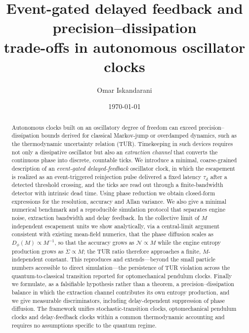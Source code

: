 \documentclass[aps,pre,reprint,amsmath,amssymb,floatfix,nofootinbib]{revtex4-2}
\newcommand{\Sdot}{\dot{\Sigma}}
\newcommand{\Dphi}{D_{\phi}}
\newcommand{\taud}{\tau_{\mathrm{d}}}
\begin{document}
\title{Event-gated delayed feedback and precision--dissipation\\
trade-offs in autonomous oscillator clocks}

\author{Omar Iskandarani}

\date{\today}

\begin{abstract}
Autonomous clocks built on an oscillatory degree of freedom can exceed
precision--dissipation bounds derived for classical Markov-jump or
overdamped dynamics, such as the thermodynamic uncertainty relation
(TUR). Timekeeping in such devices requires not only a dissipative
oscillator but also an \emph{extraction channel} that converts the
continuous phase into discrete, countable ticks. We introduce a minimal,
coarse-grained description of an \emph{event-gated delayed-feedback}
oscillator clock, in which the escapement is realized as an
event-triggered reinjection pulse delivered a fixed latency $\taud$ after
a detected threshold crossing, and the ticks are read out through a
finite-bandwidth detector with intrinsic dead time. Using phase reduction
we obtain closed-form expressions for the resolution, accuracy and Allan
variance. We also give a minimal numerical benchmark and a reproducible
simulation protocol that separates engine noise, extraction bandwidth and
delay feedback. In the collective limit of $M$
independent escapement units we show analytically, via a central-limit
argument consistent with existing mean-field numerics, that the phase
diffusion scales as $\Dphi(M)\propto M^{-1}$, so that the accuracy grows
as $\mathcal{N}\propto M$ while the engine entropy production grows as
$\Sdot\propto M$; the TUR ratio therefore approaches a finite,
$M$-independent constant. This reproduces and extends---beyond the small
particle numbers accessible to direct simulation---the persistence of TUR
violation across the quantum-to-classical transition reported for
optomechanical pendulum clocks. Finally we formulate, as a falsifiable
hypothesis rather than a theorem, a precision--dissipation balance in
which the extraction channel contributes its own entropy production, and
we give measurable discriminators, including delay-dependent suppression
of phase diffusion. The framework unifies stochastic-transition clocks,
optomechanical pendulum clocks and delay-feedback clocks within a common
thermodynamic accounting and requires no assumptions specific to the quantum regime.
\end{abstract}
\end{document}
